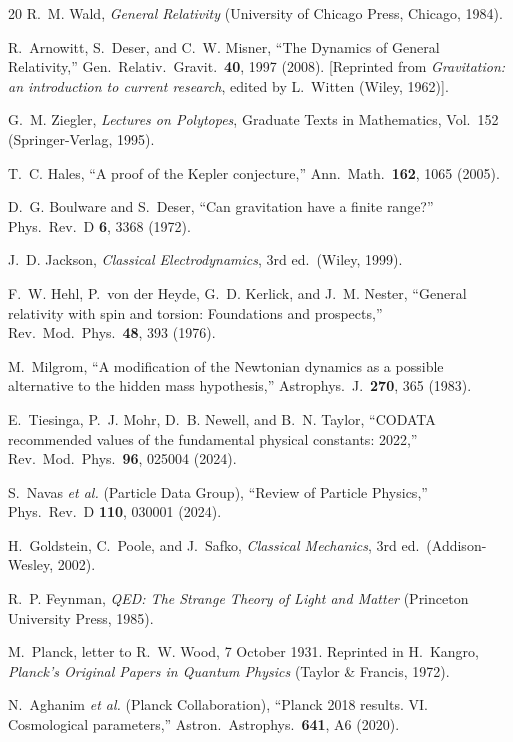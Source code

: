 \documentclass[aps,prd,preprint,superscriptaddress,showpacs,preprintnumbers,amsmath,amssymb,nofootinbib]{revtex4-2}
\begin{document}
\begin{thebibliography}{20}
R.~M. Wald, \emph{General Relativity} (University of Chicago Press, Chicago, 1984).

R.~Arnowitt, S.~Deser, and C.~W. Misner, ``The Dynamics of General Relativity,'' Gen.\ Relativ.\ Gravit.\ \textbf{40}, 1997 (2008). [Reprinted from \emph{Gravitation: an introduction to current research}, edited by L.~Witten (Wiley, 1962)].

G.~M. Ziegler, \emph{Lectures on Polytopes}, Graduate Texts in Mathematics, Vol.~152 (Springer-Verlag, 1995).

T.~C. Hales, ``A proof of the Kepler conjecture,'' Ann.\ Math.\ \textbf{162}, 1065 (2005).

D.~G. Boulware and S.~Deser, ``Can gravitation have a finite range?'' Phys.\ Rev.\ D \textbf{6}, 3368 (1972).

J.~D. Jackson, \emph{Classical Electrodynamics}, 3rd ed.\ (Wiley, 1999).

F.~W. Hehl, P.~von der Heyde, G.~D. Kerlick, and J.~M. Nester, ``General relativity with spin and torsion: Foundations and prospects,'' Rev.\ Mod.\ Phys.\ \textbf{48}, 393 (1976).

M.~Milgrom, ``A modification of the Newtonian dynamics as a possible alternative to the hidden mass hypothesis,'' Astrophys.\ J.\ \textbf{270}, 365 (1983).

E.~Tiesinga, P.~J. Mohr, D.~B. Newell, and B.~N. Taylor, ``CODATA recommended values of the fundamental physical constants: 2022,'' Rev.\ Mod.\ Phys.\ \textbf{96}, 025004 (2024).

S.~Navas \textit{et al.} (Particle Data Group), ``Review of Particle Physics,'' Phys.\ Rev.\ D \textbf{110}, 030001 (2024).

H.~Goldstein, C.~Poole, and J.~Safko, \emph{Classical Mechanics}, 3rd ed.\ (Addison-Wesley, 2002).

R.~P. Feynman, \emph{QED: The Strange Theory of Light and Matter} (Princeton University Press, 1985).

M.~Planck, letter to R.~W. Wood, 7 October 1931. Reprinted in H.~Kangro, \emph{Planck's Original Papers in Quantum Physics} (Taylor \& Francis, 1972).

N.~Aghanim \textit{et al.} (Planck Collaboration), ``Planck 2018 results. VI. Cosmological parameters,'' Astron.\ Astrophys.\ \textbf{641}, A6 (2020).


\end{thebibliography}
\end{document}
